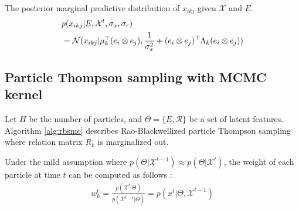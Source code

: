\documentclass{article}
\begin{document}
The posterior marginal predictive distribution of $x_{ikj}$ given $\mathcal{X}$ and $E$.
\begin{align}
\label{eqn:marginal_predict}
&p(x_{ikj}| E, \mathcal{X}^{t}, \sigma_x, \sigma_r) \\
&= \mathcal{N}(x_{ikj}| \mu_k ^\top (e_i \otimes e_j), \frac{1}{\sigma_x^2} +  (e_i \otimes e_j)^\top \Lambda_k (e_i \otimes e_j)) \notag
\end{align}

\subsection{Particle Thompson sampling with MCMC kernel}
Let $H$ be the number of particles, and $\Theta= \{E, \mathcal{R}\}$ be a set of latent features.
Algorithm \ref{alg:rbsmc} describes Rao-Blackwellized particle Thompson sampling where relation matrix $R_k$ is marginalized out.

Under the mild assumption where $p(\Theta | \mathcal{X}^{t-1}) \approx p(\Theta | \mathcal{X}^{t})$, the weight of each particle at time $t$ can be computed as follows \cite{del2006sequential,chopin2002sequential}:
\begin{align}
w_{h}^{t} = \frac{p(\mathcal{X}^{t} | \Theta)}{p(\mathcal{X}^{t-1} | \Theta)} = p(x^{t} | \Theta, \mathcal{X}^{t-1})
\end{align}


%
\end{document}
